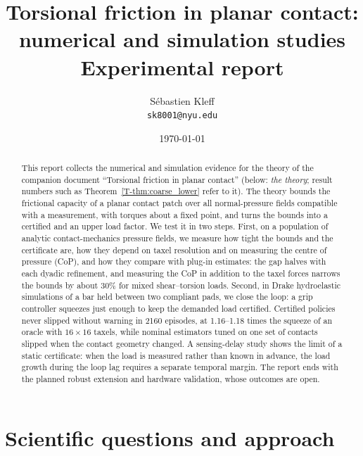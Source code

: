 \documentclass[11pt,a4paper]{article}
\title{\textbf{Torsional friction in planar contact:\\ numerical and simulation studies}\\[4pt]\large Experimental report}
\author{Sébastien Kleff\\[2pt]\small\texttt{sk8001@nyu.edu}}
\date{\today}
\newcommand{\T}[1]{\ref{T-#1}}                       %
\begin{document}
\maketitle

\begin{abstract}
This report collects the numerical and simulation evidence for the theory of the companion document ``Torsional friction in planar contact''
(below: \emph{the theory}; result numbers such as Theorem~\T{thm:coarse_lower} refer to it). The theory bounds the frictional capacity of a planar
contact patch over all normal-pressure fields compatible with a measurement, with torques about a fixed point, and turns the bounds into a certified
and an upper load factor. We test it in
two steps. First, on a population of analytic contact-mechanics pressure fields, we measure how tight the bounds and the certificate are, how
they depend on taxel resolution and on measuring the centre of pressure (CoP), and how they compare with plug-in estimates: the gap halves with
each dyadic refinement, and measuring the CoP in addition to the taxel forces narrows the bounds by about 30\% for mixed shear--torsion loads.
Second, in Drake
hydroelastic simulations of a bar held between two compliant pads, we close the loop: a grip controller squeezes just enough to keep the
demanded load certified. Certified policies never slipped without warning in 2160 episodes, at 1.16--1.18 times the squeeze of an oracle with
$16\times16$ taxels, while nominal estimators tuned on one set of contacts slipped when the contact geometry changed. A sensing-delay study
shows the limit of a static certificate: when the load is measured rather than known in advance, the load growth during the loop lag
requires a separate temporal margin. The report ends with the planned robust extension and hardware validation, whose outcomes are open.
\end{abstract}

\tableofcontents

\section{Scientific questions and approach}
\label{sec:questions}
\end{document}

